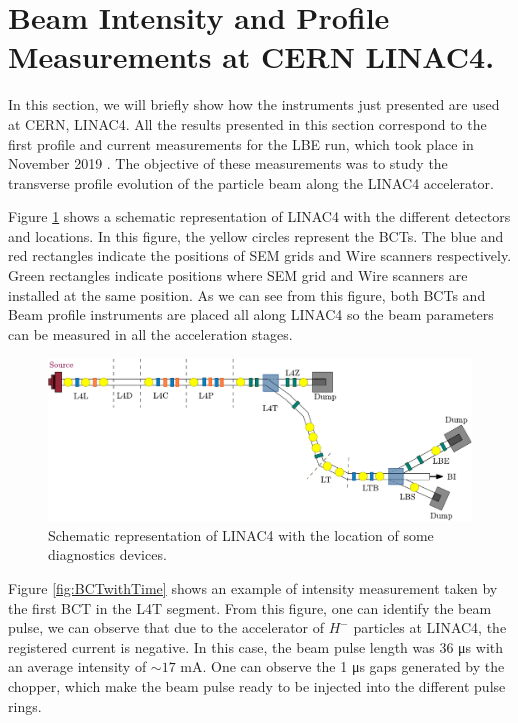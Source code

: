 \section{Beam Intensity and Profile Measurements at CERN LINAC4.}

In this section, we will briefly show how the instruments just presented are used at CERN, LINAC4. All the results presented in this section correspond to the first profile and current measurements for the LBE run, which took place in November 2019 \parencite*[][]{ref:PresentationLBERun}. The objective of these measurements was to study the transverse profile evolution of the particle beam along the LINAC4 accelerator. 

Figure \ref{fig:Linac4Layout} shows a schematic representation of LINAC4 with the different detectors and locations. In this figure, the yellow circles represent the BCTs. The blue and red rectangles indicate the positions of SEM grids and Wire scanners respectively. Green rectangles indicate positions where SEM grid and Wire scanners are installed at the same position. As we can see from this figure, both BCTs and Beam profile instruments are placed all along LINAC4 so the beam parameters can be measured in all the acceleration stages. 

\begin{figure}[h]
    \centering
    \includegraphics[width=1.0\columnwidth]{Linac4Instrumetnation/Linac4Instruments.pdf}
    \caption{Schematic representation of LINAC4 with the location of some diagnostics devices.}
    \label{fig:Linac4Layout}
\end{figure}

Figure \ref{fig:BCTwithTime} shows an example of intensity measurement taken by the first BCT in the L4T segment. From this figure, one can identify the beam pulse, we can observe that due to the accelerator of $H^{-}$ particles at LINAC4, the registered current is negative. In this case, the beam pulse length was 36 \si[]{\micro \second} with an average intensity of $\sim 17 $ \si[]{\milli \ampere}. One can observe the 1 \si[]{\micro \second} gaps generated by the chopper, which make the beam pulse ready to be injected into the different pulse rings. 

